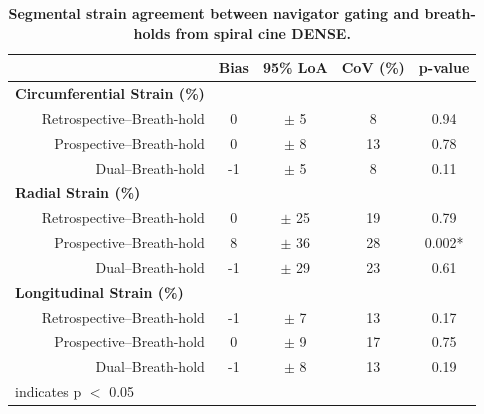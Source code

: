 	\begin{table}
		\centering
		\caption[Segmental strain agreement between navigator gating and breath-holds from spiral cine DENSE]{\textbf{Segmental strain agreement between navigator gating and breath-holds from spiral cine DENSE.}}
		\label{table:nav_CI_seg_strains}
		\begin{tabular}{c c c c c}
			\toprule
			\multicolumn{1}{c}{}&\multicolumn{1}{c}{\textbf{Bias}}&\multicolumn{1}{c}{\textbf{95\% LoA}}& \multicolumn{1}{c}{\textbf{CoV (\%)}} & \multicolumn{1}{c}{\textbf{p-value}}\\ \midrule
			\multicolumn{1}{l}{\textbf{Circumferential Strain (\%)}}                       						   & \multicolumn{4}{c}{}     \\
			\multicolumn{1}{r}{Retrospective--Breath-hold}  & \multicolumn{1}{c}{0}  & \multicolumn{1}{c}{$\pm$ 5} & \multicolumn{1}{c}{8}   & \multicolumn{1}{c}{0.94} \\
			\multicolumn{1}{r}{Prospective--Breath-hold}    & \multicolumn{1}{c}{0}  & \multicolumn{1}{c}{$\pm$ 8} & \multicolumn{1}{c}{13}  & \multicolumn{1}{c}{0.78} \\
			\multicolumn{1}{r}{Dual--Breath-hold}           & \multicolumn{1}{c}{-1} & \multicolumn{1}{c}{$\pm$ 5} & \multicolumn{1}{c}{8}   & \multicolumn{1}{c}{0.11} \\
			\multicolumn{1}{l}{\textbf{Radial Strain (\%)}}                       						   & \multicolumn{4}{c}{}     \\
			\multicolumn{1}{r}{Retrospective--Breath-hold}  & \multicolumn{1}{c}{0}  & \multicolumn{1}{c}{$\pm$ 25} & \multicolumn{1}{c}{19}   & \multicolumn{1}{c}{0.79} \\
			\multicolumn{1}{r}{Prospective--Breath-hold}    & \multicolumn{1}{c}{8}  & \multicolumn{1}{c}{$\pm$ 36} & \multicolumn{1}{c}{28}  & \multicolumn{1}{c}{0.002*} \\
			\multicolumn{1}{r}{Dual--Breath-hold}           & \multicolumn{1}{c}{-1} & \multicolumn{1}{c}{$\pm$ 29} & \multicolumn{1}{c}{23}   & \multicolumn{1}{c}{0.61} \\
			\multicolumn{1}{l}{\textbf{Longitudinal Strain (\%)}}                       						   & \multicolumn{4}{c}{}     \\
			\multicolumn{1}{r}{Retrospective--Breath-hold}  & \multicolumn{1}{c}{-1} & \multicolumn{1}{c}{$\pm$ 7} & \multicolumn{1}{c}{13}   & \multicolumn{1}{c}{0.17} \\
			\multicolumn{1}{r}{Prospective--Breath-hold}    & \multicolumn{1}{c}{0}  & \multicolumn{1}{c}{$\pm$ 9} & \multicolumn{1}{c}{17}   & \multicolumn{1}{c}{0.75} \\
			\multicolumn{1}{r}{Dual--Breath-hold}           & \multicolumn{1}{c}{-1} & \multicolumn{1}{c}{$\pm$ 8} & \multicolumn{1}{c}{13}   & \multicolumn{1}{c}{0.19} \\
			\bottomrule
			\multicolumn{5}{l}{\footnotesize* indicates p $<$ 0.05} \\                                 
		\end{tabular}
	\end{table}
	
